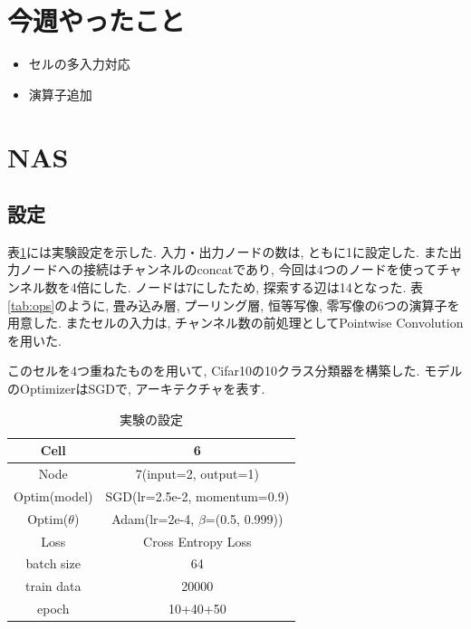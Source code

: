 \documentclass[twocolumn]{jarticle}     %
\begin{document}


\section{今週やったこと}
\begin{itemize}
	\item {セルの多入力対応}
	\item {演算子追加}
\end{itemize}

\section{NAS}
\subsection{設定}
表\ref{tab:setting}には実験設定を示した.
入力・出力ノードの数は, ともに1に設定した.
また出力ノードへの接続はチャンネルのconcatであり, 今回は4つのノードを使ってチャンネル数を4倍にした.
ノードは7にしたため, 探索する辺は14となった.
表\ref{tab:ops}のように, 畳み込み層, プーリング層, 恒等写像, 零写像の6つの演算子を用意した.
またセルの入力は, チャンネル数の前処理としてPointwise Convolutionを用いた.

このセルを4つ重ねたものを用いて, Cifar10の10クラス分類器を構築した.
モデルのOptimizerはSGDで, アーキテクチャを表す.

\begin{table}[tb]
  \begin{center}
    \caption{実験の設定}
    \begin{tabular}{|c|c|} \hline
      Cell & 6 \\ \hline
      Node & 7(input=2, output=1) \\ \hline
      Optim(model) & SGD(lr=2.5e-2, momentum=0.9) \\ \hline
      Optim($\theta$) & Adam(lr=2e-4, $\beta$=(0.5, 0.999)) \\ \hline
      Loss & Cross Entropy Loss \\ \hline
      batch size & 64 \\ \hline
      train data & 20000 \\ \hline
      epoch & 10+40+50 \\ \hline
    \end{tabular}
    \label{tab:setting}
  \end{center}
\end{table}
\end{document}
